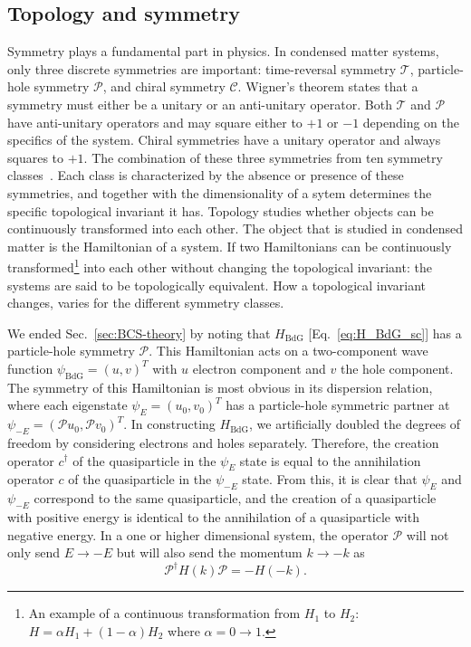\subsection{Topology and symmetry}\label{sec:topology}
Symmetry plays a fundamental part in physics.
In condensed matter systems, only three discrete symmetries are important: time-reversal symmetry $\mathcal{T}$, particle-hole symmetry $\mathcal{P}$, and chiral symmetry $\mathcal{C}$.
Wigner's theorem states that a symmetry must either be a unitary or an anti-unitary operator.
Both $\mathcal{T}$ and $\mathcal{P}$ have anti-unitary operators and may square either to $+1$ or $-1$ depending on the specifics of the system.
Chiral symmetries have a unitary operator and always squares to $+1$.
The combination of these three symmetries from ten symmetry classes~\cite{Altland1997}.
Each class is characterized by the absence or presence of these symmetries, and together with the dimensionality of a sytem determines the specific topological invariant it has.
Topology studies whether objects can be continuously transformed into each other.
The object that is studied in condensed matter is the Hamiltonian of a system.
If two Hamiltonians can be continuously transformed\footnote{An example of a continuous transformation from $H_{1}$ to $H_{2}$: $H=\alpha H_{1}+(1-\alpha)H_{2}$ where $\alpha=0\rightarrow1$.} into each other without changing the topological invariant: the systems are said to be topologically equivalent.
How a topological invariant changes, varies for the different symmetry classes.

We ended Sec.~\ref{sec:BCS-theory} by noting that $H_{\textrm{BdG}}$ [Eq.~\eqref{eq:H_BdG_sc}] has a particle-hole symmetry $\mathcal{P}$.
This Hamiltonian acts on a two-component wave function $\psi_{\textrm{BdG}}=\left(u,v\right)^{T}$ with $u$ electron component and $v$ the hole component.
The symmetry of this Hamiltonian is most obvious in its dispersion relation, where each eigenstate $\psi_{E}=\left(u_{0},v_{0}\right)^{T}$ has a particle-hole symmetric partner at $\psi_{-E}=\left(\mathcal{P}u_{0},\mathcal{P}v_{0}\right)^{T}$.
In constructing $H_{\textrm{BdG}}$, we artificially doubled the degrees of freedom by considering electrons and holes separately.
Therefore, the creation operator $c^{\dagger}$ of the quasiparticle in the $\psi_{E}$ state is equal to the annihilation operator $c$ of the quasiparticle in the $\psi_{-E}$ state.
From this, it is clear that $\psi_{E}$ and $\psi_{-E}$ correspond to the same quasiparticle, and the creation of a quasiparticle with positive energy is identical to the annihilation of a quasiparticle with negative energy.
In a one or higher dimensional system, the operator $\mathcal{P}$ will not only send $E \rightarrow -E$ but will also send the momentum $k \rightarrow -k$ as
\begin{equation}
\mathcal{P^{\dagger}}H\left(k\right)\mathcal{P}=-H\left(-k\right).
\end{equation}

